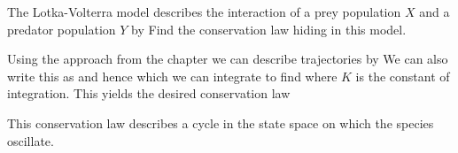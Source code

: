 The Lotka-Volterra model describes the interaction of a prey population  $X$ and a predator population $Y$ by 
Find the conservation law hiding in this model. 

\solution 
Using the approach from the chapter we can describe trajectories by  
We can also write this as 
and hence 
which we can integrate 
to find 
where $K$ is the constant of integration. This yields the desired conservation law

This conservation law describes a cycle in the state space on which the species oscillate. 

